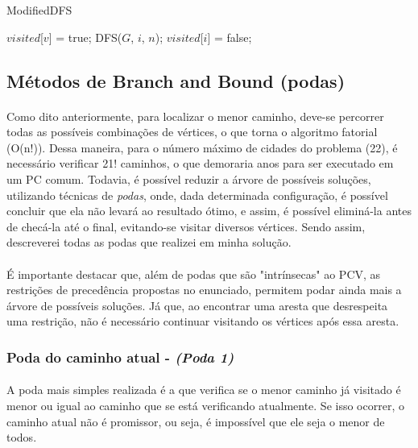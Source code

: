 \documentclass[a4paper, 12pt]{article}
\begin{document}
\begin{algorithm}
\caption{ModifiedDFS}
\begin{algorithmic}
    \State $visited$[$v$] = true;
			\State DFS($G$, $i$, $n$);
			\State $visited$[$i$] = false;			
		\EndIf  
    \EndFor
\EndFunction
\end{algorithmic}
\end{algorithm}




\subsection{Métodos de Branch and Bound (podas)}
\paragraph{}
Como dito anteriormente, para localizar o menor caminho, deve-se percorrer todas as possíveis combinações de vértices, o que torna o algoritmo fatorial (O(n!)). Dessa maneira, para o número máximo de cidades do problema (22), é necessário verificar 21! caminhos, o que demoraria anos para ser executado em um PC comum. Todavia, é possível reduzir a árvore de possíveis soluções, utilizando técnicas de \textit{podas}, onde, dada determinada configuração, é possível concluir que ela não levará ao resultado ótimo, e assim, é possível eliminá-la antes de checá-la até o final, evitando-se visitar diversos vértices. Sendo assim, descreverei todas as podas que realizei em minha solução.

\paragraph{}
É importante destacar que, além de podas que são "intrínsecas" ao PCV, as restrições de precedência propostas no enunciado, permitem podar ainda mais a árvore de possíveis soluções. Já que, ao encontrar uma aresta que desrespeita uma restrição, não é necessário continuar visitando os vértices após essa aresta.

\subsubsection{Poda do caminho atual - \textit{(Poda 1)}}
\paragraph{}
A poda mais simples realizada é a que verifica se o menor caminho já visitado é menor ou igual ao caminho que se está verificando atualmente. Se isso ocorrer, o caminho atual não é promissor, ou seja, é impossível que ele seja o menor de todos.
\end{document}
